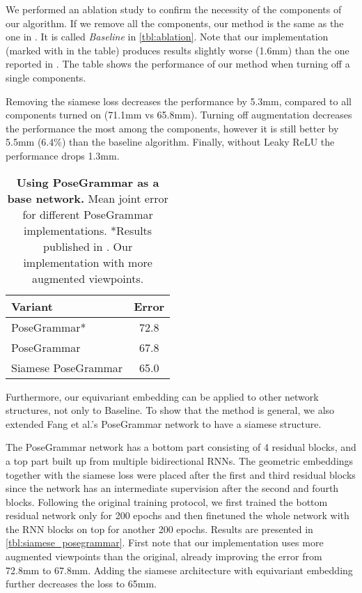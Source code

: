 \documentclass[preprint]{elsarticle}
\begin{document}
We performed an ablation study to confirm the necessity of the components of our algorithm. If we remove all the components, our method is the same as the one in \cite{3dbaseline}. It is called \textit{Baseline} in \autoref{tbl:ablation}. Note that our implementation (marked with  in the table) produces results slightly worse (1.6mm) than the one reported in \cite{fang2018posegrammar}. The table shows the performance of our method when turning off a single components.

Removing the siamese loss decreases the performance by 5.3mm, compared to all components turned on (71.1mm vs 65.8mm). 
Turning off augmentation decreases the performance the most among the components, however it is still better by 5.5mm (6.4\%) than the baseline algorithm. Finally, without Leaky ReLU the performance drops 1.3mm.


\begin{table}[ht]
\centering
    \begin{tabular}[t]{lc}
    \hline
    Variant & Error \\
    \hline
    PoseGrammar* & 72.8 \\
    PoseGrammar  & 67.8 \\
    Siamese PoseGrammar & 65.0  \\ 
    \hline
    \end{tabular}
    \caption{\textbf{Using PoseGrammar as a base network.} Mean joint error for different PoseGrammar implementations. *Results published in \cite{fang2018posegrammar}. Our implementation with more augmented viewpoints. }
    \label{tbl:siamese_posegrammar}
\end{table}

Furthermore, our equivariant embedding can be applied to other network structures, not only to Baseline. To show that the method is general, we also extended Fang et al.'s PoseGrammar \cite{fang2018posegrammar} network to have a siamese structure. 

The PoseGrammar network has a bottom part consisting of 4 residual blocks, and a top part built up from multiple bidirectional RNNs. The geometric embeddings together with the siamese loss were placed after the first and third residual blocks since the network has an intermediate supervision after the second and fourth blocks. Following the original training protocol, we first trained the bottom residual network only for 200 epochs and then finetuned the whole network with the RNN blocks on top for another 200 epochs. Results are presented in  \autoref{tbl:siamese_posegrammar}. First note that our implementation uses more augmented viewpoints than the original, already improving the error from 72.8mm to 67.8mm. Adding the siamese architecture with equivariant embedding further decreases the loss to 65mm.
\end{document}
